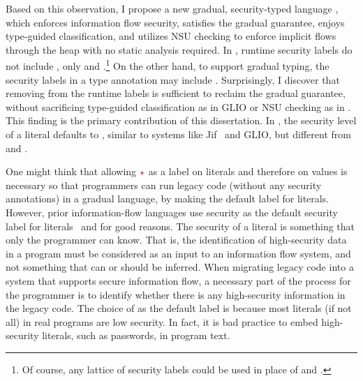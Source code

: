Based on this observation, I propose a new gradual, security-typed language
\Surface, which  enforces information flow security, 
satisfies the gradual guarantee,  enjoys type-guided classification,
and  utilizes NSU checking to enforce implicit flows through the heap
with no static analysis required.
%
In \Surface, runtime security labels do not include \unk, only \low
and \high.\footnote{Of course, any lattice of security labels could be
used in place of \low and \high.}  On the other hand, to support
gradual typing, the security labels in a type annotation may
include \unk. Surprisingly, I discover that removing \unk from the
runtime labels is sufficient to reclaim the gradual guarantee, without
sacrificing type-guided classification as in GLIO or NSU checking as
in \WHILEG. This finding is the primary contribution of this dissertation.
%
In \Surface, the security level of a literal defaults to \low,
similar to systems like Jif~\parencite{Myers:2006aa} and GLIO, but
different from \GSLRef and \WHILEG.

One might think that allowing $\unk$ as a label on literals and therefore on
values is necessary so that programmers can run legacy code (without any
security annotations) in a gradual language, by making \unk the default label
for literals. However, prior information-flow languages use \low security as the
default security label for literals~\parencite{Myers:2006aa} and for good reasons.
The security of a literal is something that only the programmer can know. That
is, the identification of high-security data in a program must be considered as
an input to an information flow system, and not something that can or should be
inferred. When migrating legacy code into a system that supports secure
information flow, a necessary part of the process for the programmer is to
identify whether there is any high-security information in the legacy code. The
choice of \low as the default label is because most literals (if not all) in
real programs are low security. In fact, it is bad practice to embed
high-security literals, such as passwords, in program text.

\vspace{20pt}

